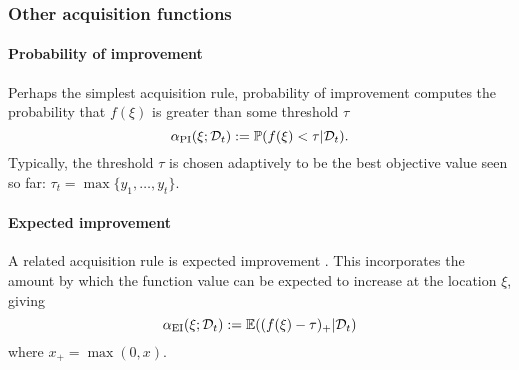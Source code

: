 \documentclass[a4paper, 10pt]{report}
\theoremstyle{plain}
\begin{document}
	
	
	
	
	\subsubsection{Other acquisition functions}
	
	
	\paragraph{Probability of improvement} Perhaps the simplest acquisition rule, probability of improvement \citep{kushner1964new} computes the probability that $f(\xi)$ is greater than some threshold $\tau$
	\begin{equation}
	\alpha_\text{PI}(\xi; \mathcal{D}_t) := {\mathbb{P}}(f(\xi) < \tau | \mathcal{D}_t).
	\end{equation}
	Typically, the threshold $\tau$ is chosen adaptively to be the best objective value seen so far: $\tau_t = \max \{y_1,\dots,y_t\}$.
	
	\paragraph{Expected improvement} A related acquisition rule is expected improvement \citep{mockus1978application}. This incorporates the amount by which the function value can be expected to increase at the location $\xi$, giving
	\begin{equation}
	\alpha_\text{EI}(\xi; \mathcal{D}_t) := \mathbb{E}((f(\xi) - \tau)_+ | \mathcal{D}_t)
	\end{equation}
	where $x_+ = \max(0, x)$.
	
\end{document}

